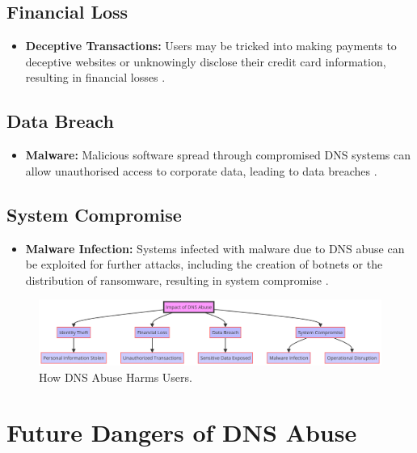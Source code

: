 \subsection{Financial Loss}
\begin{itemize}
    \item \textbf{Deceptive Transactions:} Users may be tricked into making payments to deceptive websites or unknowingly disclose their credit card information, resulting in financial losses \cite{bohme2013economics}.
\end{itemize}

\subsection{Data Breach}
\begin{itemize}
    \item \textbf{Malware:} Malicious software spread through compromised DNS systems can allow unauthorised access to corporate data, leading to data breaches \cite{fowler2016data}.
\end{itemize}

\subsection{System Compromise}
\begin{itemize}
    \item \textbf{Malware Infection:} Systems infected with malware due to DNS abuse can be exploited for further attacks, including the creation of botnets or the distribution of ransomware, resulting in system compromise \cite{saxe2018malware}.
\end{itemize}
\captionsetup{font= footnotesize}
\begin{figure}[H]
\centering
\includegraphics[width=\textwidth]{background/DNSabuseHarm.png}
\caption{How DNS Abuse Harms Users.}
\label{fig:figureFour}
\end{figure}


\section{Future Dangers of DNS Abuse}

